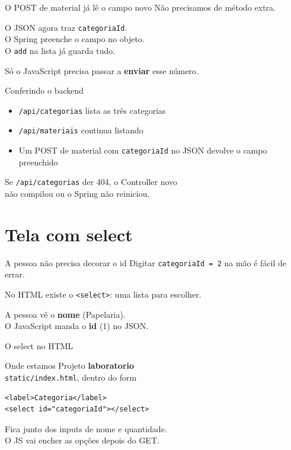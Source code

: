 \documentclass[aspectratio=169,11pt]{beamer}
\newcommand{\onde}[1]{%
  \begin{block}{Onde estamos}
    #1
  \end{block}
}
\begin{document}
\begin{frame}{O POST de material já lê o campo novo}
  Não precisamos de método extra.

  \vspace{0.5em}
  O JSON agora traz \texttt{categoriaId}.\\
  O Spring preenche o campo no objeto.\\
  O \texttt{add} na lista já guarda tudo.

  \vspace{0.5em}
  Só o JavaScript precisa passar a \textbf{enviar} esse número.
\end{frame}

\begin{frame}{Conferindo o backend}
  \begin{itemize}
    \item [ ] \texttt{/api/categorias} lista as três categorias
    \item [ ] \texttt{/api/materiais} continua listando
    \item [ ] Um POST de material com \texttt{categoriaId} no JSON
          devolve o campo preenchido
  \end{itemize}

  \vspace{0.5em}
  Se \texttt{/api/categorias} der 404, o Controller novo\\
  não compilou ou o Spring não reiniciou.
\end{frame}

\section{Tela com select}

\begin{frame}{A pessoa não precisa decorar o id}
  Digitar \texttt{categoriaId = 2} na mão é fácil de errar.

  \vspace{0.5em}
  No HTML existe o \texttt{<select>}: uma lista para escolher.

  \vspace{0.5em}
  A pessoa vê o \textbf{nome} (Papelaria).\\
  O JavaScript manda o \textbf{id} (1) no JSON.
\end{frame}

\begin{frame}[fragile]{O select no HTML}
  \onde{Projeto \textbf{laboratorio}\\
        \texttt{static/index.html}, dentro do form}

\begin{lstlisting}[basicstyle=\ttfamily\footnotesize]
<label>Categoria</label>
<select id="categoriaId"></select>
\end{lstlisting}

  \vspace{0.5em}
  Fica junto dos inputs de nome e quantidade.\\
  O JS vai encher as opções depois do GET.
\end{frame}
\end{document}
